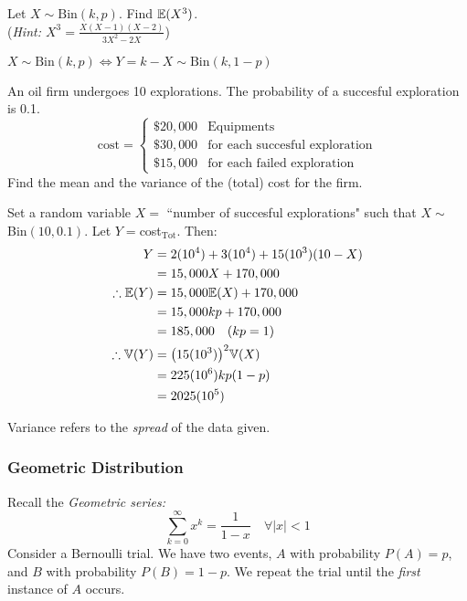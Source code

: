 \documentclass{article}
\begin{document}
		\begin{exe}
			Let $X \sim \text{Bin}(k, p)$. Find $\mathbb{E}(X^3)$. \\
			({\footnotesize \emph{Hint: $X^3 = \frac{X(X-1)(X-2)}{3X^2 - 2X}$}})
		\end{exe}
		\begin{rem}
			$X \sim \text{Bin}(k, p) \iff Y = k - X \sim \text{Bin} (k, 1-p) $
		\end{rem}
		\begin{exmp}
			An oil firm undergoes 10 explorations. The probability of a succesful exploration is 0.1. 
			$$ \text{cost} = 
			\begin{cases}
				\$20,000 &\text{Equipments} \\
				\$ 30,000 &\text{for each succesful exploration}\\
				\$ 15,000 &\text{for each failed exploration}
			\end{cases}
			$$
			Find the mean and the  variance of the (total) cost for the firm.
			
			\begin{sol}
				Set a random variable $X=$ ``number of succesful explorations" such that $X \sim $Bin$(10,0.1)$. Let $Y=$cost$_{\text{Tot}}$. Then:
				\begin{align*}
					Y &= 2(10^4) + 3(10^4) + 15(10^3) (10-X) \\
					&= 15,000X + 170,000 \\
					\therefore \mathbb{E}(Y) &= 15,000 \mathbb{E}(X) + 170,000 \\
					&= 15,000 kp + 170,000 \\
					&= 185,000 \quad (kp=1)\\
					\therefore \mathbb{V}(Y) &= \big(15(10^3)\big)^2 \mathbb{V} (X)\\
					&= 225(10^6) kp (1-p) \\
					&= 2025 (10^5) \\
				\end{align*}
				\begin{note}Variance refers to the \emph{spread} of the data given.
				\end{note}
			\end{sol}
		\end{exmp}
	\pagebreak
	\subsubsection{Geometric Distribution}
	Recall the \emph{Geometric series:} 
	$$ \sum_{k=0}^\infty x^k = \frac{1}{1-x} \quad \forall |x| <1$$
	Consider a Bernoulli trial. We have two events, $A$ with probability $P(A)=p$, and $B$ with probability $P(B)= 1-p$. We repeat the trial until the \emph{first} instance of $A$ occurs.
	
\end{document}
